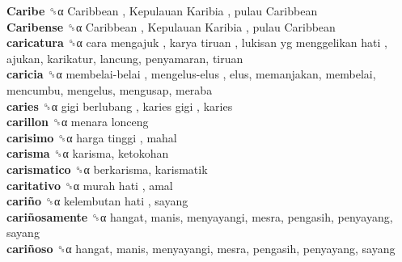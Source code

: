 \textbf{Caribe} ␝α   Caribbean ,  Kepulauan Karibia ,  pulau Caribbean   \\
\textbf{Caribense} ␝α   Caribbean ,  Kepulauan Karibia ,  pulau Caribbean   \\
\textbf{caricatura} ␝α   cara mengajuk ,  karya tiruan ,  lukisan yg menggelikan hati , ajukan, karikatur, lancung, penyamaran, tiruan  \\
\textbf{caricia} ␝α   membelai-belai ,  mengelus-elus , elus, memanjakan, membelai, mencumbu, mengelus, mengusap, meraba  \\
\textbf{caries} ␝α   gigi berlubang ,  karies gigi , karies  \\
\textbf{carillon} ␝α   menara lonceng   \\
\textbf{carisimo} ␝α   harga tinggi , mahal  \\
\textbf{carisma} ␝α  karisma, ketokohan  \\
\textbf{carismatico} ␝α  berkarisma, karismatik  \\
\textbf{caritativo} ␝α   murah hati , amal  \\
\textbf{cariño} ␝α   kelembutan hati , sayang  \\
\textbf{cariñosamente} ␝α  hangat, manis, menyayangi, mesra, pengasih, penyayang, sayang  \\
\textbf{cariñoso} ␝α  hangat, manis, menyayangi, mesra, pengasih, penyayang, sayang  \\
